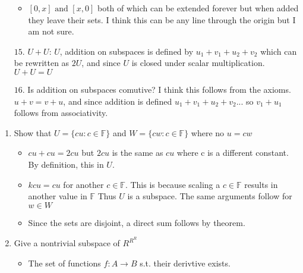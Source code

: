 \documentclass[a4paper]{article}
\begin{document}
\begin{enumerate}
        \begin{itemize}
            \item $[0,x] \text{ and } [x,0]$ both of which can be extended forever but when added they leave their sets. I think this can be any line through the origin but I am not sure.
        \end{itemize}
        \item[$15.$] $U + U$:  $U$, addition on subspaces is defined by $u_1 + v_1 + u_2 + v_2$ which can be rewritten as $2U$, and since $U$ is closed under scalar multiplication. $U + U = U$
        \item[$16.$] Is addition on subspaces comutive? I think this follows from the axioms. $u + v = v + u$, and since addition is defined $u_1 + v_1 + u_2 + v_2...$ so $v_1 + u_1$ follows from associativity. \\

\end{enumerate}
\begin{enumerate}
    \item Show that $U = \{cu: c \in \mathbb{F}\}$ and $W = \{cw: c \in  \mathbb{F}\} $ where no $u = cw$
        \begin{itemize}
            \item $cu + cu = 2cu$ but $2cu$ is the same as $cu$ where c is a different constant. By definition, this in $U$.
            \item  $kcu = cu$ for another $c \in \mathbb{F}$. This is because scaling a $c \in  \mathbb{F}$ results in another value in $\mathbb{F}$ Thus $U$ is a subspace. The same arguments follow for $w \in W$
            \item Since the sets are disjoint, a direct sum follows by theorem.

        \end{itemize}
    \item Give a nontrivial subspace of $R^{R^{R}}$
        \begin{itemize}
            \item The set of functions $f: A\to B$ s.t. their derivtive exists.
        \end{itemize}
\end{enumerate}
\end{document}

